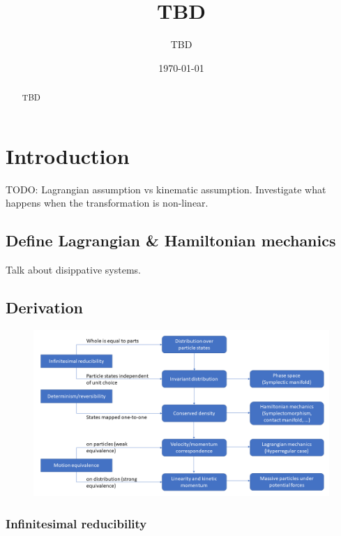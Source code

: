 \documentclass[letterpaper]{article}
\begin{document}

\title{TBD}
\author{TBD}

\date{\today}

\maketitle

\begin{abstract}
	TBD
\end{abstract}


\section{Introduction}


TODO: Lagrangian assumption vs kinematic assumption. Investigate what happens when the transformation is non-linear.

\subsection{Define Lagrangian \& Hamiltonian mechanics}

Talk about disippative systems.

\subsection{Derivation}

\begin{figure}[h]
	\centering
	\includegraphics[width=\textwidth]{Diagram.png}
\end{figure}

\subsubsection{Infinitesimal reducibility}
\end{document}
